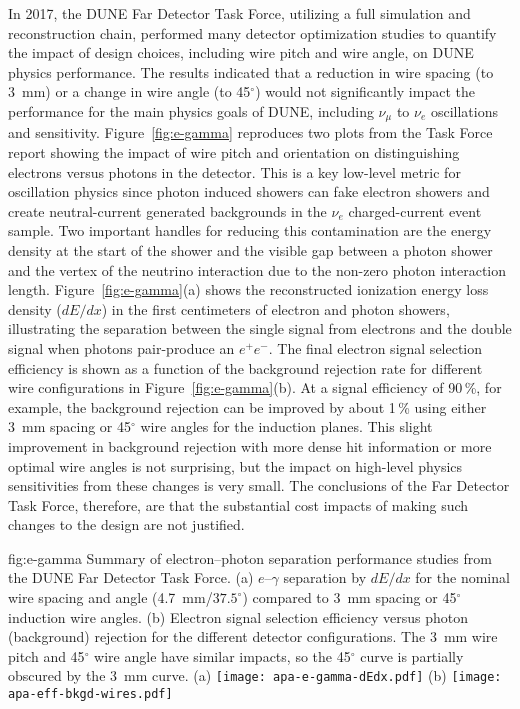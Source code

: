 \begin{itemize}
In 2017, the DUNE Far Detector Task Force, utilizing a full  simulation and reconstruction chain, performed many detector optimization studies to quantify the impact of design choices, including wire pitch and wire angle, on DUNE physics performance.  The results indicated that a reduction in wire spacing (to \SI{3}{mm}) or a change in wire angle (to \num{45}$^\circ$) would not significantly impact the performance for the main physics goals of DUNE, including $\nu_\mu $ to $\nu_e$ oscillations and  sensitivity.  Figure~\ref{fig:e-gamma} reproduces two plots from the Task Force report showing the impact of wire pitch and orientation on distinguishing electrons versus photons in the detector.  This is a key low-level metric for oscillation physics since photon induced showers can fake electron showers and create neutral-current generated backgrounds in the $\nu_e$ charged-current event sample. Two important handles for reducing this contamination are the energy density at the start of the shower and the visible gap between a photon shower and the vertex of the neutrino interaction due to the non-zero photon interaction length.  Figure~\ref{fig:e-gamma}(a) shows the reconstructed ionization energy loss density ($dE/dx$) in the first centimeters of electron and photon showers, illustrating the separation between the single  signal from electrons and the double  signal when photons pair-produce an $e^+e^-$.  The final electron signal selection efficiency is shown as a function of the background rejection rate for different wire configurations in Figure~\ref{fig:e-gamma}(b). At a signal efficiency of \num{90}\,\%, for example, the background rejection can be improved by about \num{1}\,\% using either \SI{3}{mm} spacing or 45$^\circ$ wire angles for the induction planes.  This slight improvement in background rejection with more dense hit information or more optimal wire angles is not surprising, but the impact on high-level physics sensitivities from these changes is very small. The conclusions of the Far Detector Task Force, therefore, are that the substantial cost impacts of making such changes to the  design are not justified.    

\begin{dunefigure}{fig:e-gamma}
{Summary of electron--photon separation performance studies from the DUNE Far Detector Task Force. (a) $e$--$\gamma$ separation by $dE/dx$ for the nominal wire spacing and angle (\SI{4.7}{mm}/$37.5^\circ$) compared to \SI{3}{mm} spacing or 45$^\circ$ induction wire angles. (b) Electron signal selection efficiency versus photon (background) rejection for the different detector configurations. The \SI{3}{mm} wire pitch and 45$^\circ$ wire angle have similar impacts, so the 45$^\circ$ curve is partially obscured by the \SI{3}{mm} curve.}
(a)
\texttt{[image: apa-e-gamma-dEdx.pdf]} \qquad
(b)
\texttt{[image: apa-eff-bkgd-wires.pdf]} 
\end{dunefigure}


\end{itemize}
